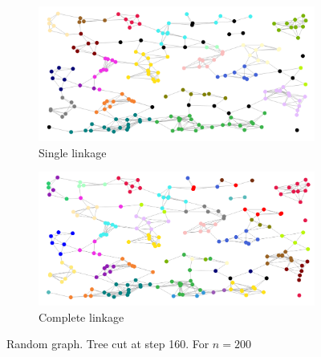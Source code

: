 \documentclass[12pt,a4paper]{article}
\begin{document}
\begin{figure}
  \centering
  \begin{subfigure}[h]{0.49\textwidth}
    \includegraphics[width=\linewidth]{img/slink-200-160.png}
    \caption{Single linkage}
  \end{subfigure}
  \begin{subfigure}[h]{0.49\textwidth}
    \includegraphics[width=\linewidth]{img/clink-200-160.png}
    \caption{Complete linkage}
  \end{subfigure}
  \caption{Random graph. Tree cut at step 160. For $n = 200$}
  \label{fig:slink-vs-clink}
\end{figure}
\end{document}
